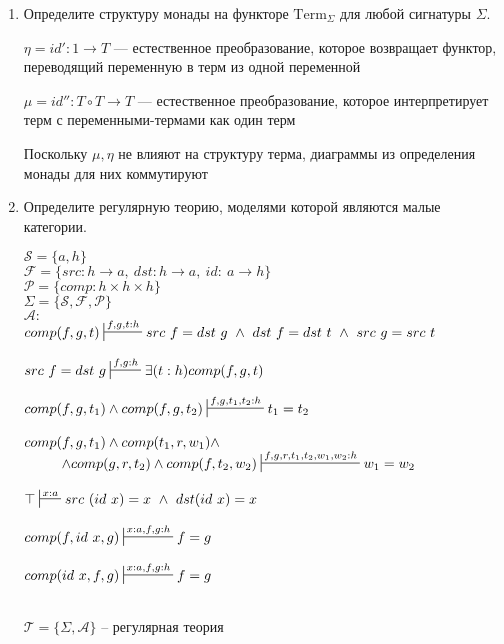 \documentclass[draft]{article}
\begin{document}
\begin{enumerate}
\item Определите структуру монады на функторе $\mathrm{Term}_\Sigma$ для любой сигнатуры $\Sigma$.

$\eta = id' : 1 \to T $ --- естественное преобразование, которое возвращает функтор, переводящий переменную в терм из одной переменной

$\mu = id'' : T\circ T \to T$ --- естественное преобразование, которое интерпретирует терм с переменными-термами как один терм

Поскольку $\mu, \eta$ не влияют на структуру терма, диаграммы из определения монады для них коммутируют

\newpage
\item Определите регулярную теорию, моделями которой являются малые категории.

$\mathcal{S} = \{a, h\}$\\
$\mathcal{F} = \{src: h \to a, ~ dst: h \to a,~id:~a \to h\}$\\
$\mathcal{P} = \{comp: h\times h \times h\}$\\
$\Sigma = \{\mathcal{S}, \mathcal{F}, \mathcal{P}\}$\\
$\mathcal{A}:$\\
$
\begin{matrix*}[l]
comp(f, g, t) \sststile{}{f,g,t:h} src~f=dst~g ~\land~ dst~f = dst~t~\land~src~g=src~t\\\\
src~f=dst~g  \sststile{}{f,g:h} \exists(t:h)comp(f, g, t)\\\\
comp(f, g, t_1)\land comp(f, g, t_2)  \sststile{}{f,g,t_1,t_2:h} t_1=t_2\\\\
comp(f, g, t_1) \land comp(t_1, r, w_1)\land\\~~~~~~~~\land
comp(g, r, t_2) \land comp(f, t_2, w_2)
 \sststile{}{f,g,r,t_1,t_2,w_1,w_2:h} w_1=w_2\\\\
\top \sststile{}{x:a} src~(id~x)=x ~\land ~dst(id~x) = x\\\\
comp(f, id~x, g) \sststile{}{x:a, f,g:h} f = g  \\\\
comp(id~x, f, g) \sststile{}{x:a, f,g:h} f = g  \\\\
\end{matrix*}
$

$\mathcal{T} = \{\Sigma, \mathcal{A}\}$ -- регулярная теория


\end{enumerate}
\end{document}
